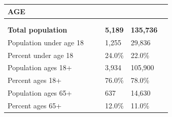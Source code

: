 \documentclass[9pt]{report}
\begin{document}
\vspace{24pt}
\setlength{\tabcolsep}{.01in} %
\begin{tabular}{p{.10in}p{.10in}p{.10in}p{3.7in}>{\hfill}p{.85in}>{\hfill}p{.85in}>{\hfill}p{.85in}>{\hfill}p{.85in}p{0.1in}}
\multicolumn{9}{l}{\parbox{7.1in}{\raggedright{\large{\strut\textbf{AGE}\strut}}}} \\ 
\hline
\multicolumn{4}{l}{\parbox{3.5in}{\raggedright{\textbf{}}}} & \multicolumn{1}{r}{\parbox{.85in}{\strut\raggedleft{\textbf{}\strut}}} & \multicolumn{1}{r}{\parbox{.85in}{\strut\raggedleft{\textbf{}\strut}}} & \multicolumn{1}{r}{\parbox{.85in}{\strut{}}} & \multicolumn{1}{r}{\parbox{.85in}{\strut{}}} & \\ 
\multicolumn{9}{l}{} \\ 
\multicolumn{4}{l}{\parbox{3.5in}{\strut\raggedright{\textbf{Total population}\strut}}} & \textbf{} & \textbf{} & \textbf{5,189} & \textbf{135,736} & \textbf{} \\ 
\multicolumn{4}{l}{\parbox{3.6in}{\strut\raggedright{{Population under age 18}}\strut}} &  &  & 1,255 & 29,836 & \multicolumn{1}{l}{}  \\ 
\multicolumn{4}{l}{\parbox{3.6in}{\strut\raggedright{{Percent under age 18}}\strut}} &  &  & 24.0\% & 22.0\% & \multicolumn{1}{l}{}  \\ 
\multicolumn{4}{l}{\parbox{3.6in}{\strut\raggedright{{Population ages 18+}}\strut}} &  &  & 3,934 & 105,900 & \multicolumn{1}{l}{}  \\ 
\multicolumn{4}{l}{\parbox{3.6in}{\strut\raggedright{{Percent ages 18+}}\strut}} &  &  & 76.0\% & 78.0\% & \multicolumn{1}{l}{}  \\ 
\multicolumn{4}{l}{\parbox{3.6in}{\strut\raggedright{{Population ages 65+}}\strut}} &  &  & 637 & 14,630 & \multicolumn{1}{l}{}  \\ 
\multicolumn{4}{l}{\parbox{3.6in}{\strut\raggedright{{Percent ages 65+}}\strut}} &  &  & 12.0\% & 11.0\% & \multicolumn{1}{l}{}  \\ 

\end{tabular}
\setlength{\tabcolsep}{6pt} %
\end{document}
